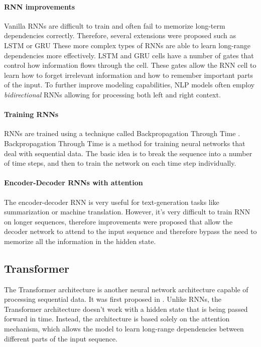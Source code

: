 \paragraph{RNN improvements}
Vanilla RNNs are difficult to train and often fail to memorize long-term dependencies correctly.
Therefore, several extensions were proposed such as LSTM \cite{hochreiter1997} or GRU \cite{cho-etal-2014-properties}
These more complex types of RNNs are able to learn long-range dependencies more effectively.
LSTM and GRU cells have a number of gates that control how information flows through the cell.
These gates allow the RNN cell to learn how to forget irrelevant information and how to remember important parts of the input.
To further improve modeling capabilities, NLP models often employ \emph{bidirectional} RNNs allowing for processing both left and right context.

\paragraph{Training RNNs}
RNNs are trained using a technique called Backpropagation Through Time \cite{werbos1990backpropagation}.
Backpropagation Through Time is a method for training neural networks that deal with sequential data.
The basic idea is to break the sequence into a number of time steps, and then to train the network on each time step individually.

\paragraph{Encoder-Decoder RNNs with attention}
The encoder-decoder RNN is very useful for text-generation tasks like summarization or machine translation.
However, it's very difficult to train RNN on longer sequences, therefore improvements were proposed \cite{bahdanau2014neural,luong-etal-2015-effective} that allow the decoder network to attend to the input sequence and therefore bypass the need to memorize all the information in the hidden state.

\subsection{Transformer}
The Transformer architecture is another neural network architecture capable of processing sequential data.
It was first proposed in \citet{vaswani2017attention}.
Unlike RNNs, the Transformer architecture doesn't work with a hidden state that is being passed forward in time.
Instead, the architecture is based solely on the attention mechanism, which allows the model to learn long-range dependencies between different parts of the input sequence.

